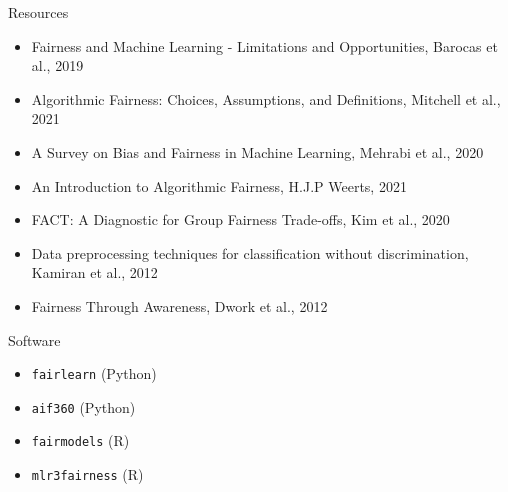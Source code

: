 \documentclass[11pt,compress,t,notes=noshow, xcolor=table]{beamer}
\begin{document}
\begin{vbframe}{Resources}
\begin{itemize}
\item Fairness and Machine Learning - Limitations and Opportunities, Barocas et al., 2019
\item Algorithmic Fairness: Choices, Assumptions, and Definitions, Mitchell et al., 2021
\item A Survey on Bias and Fairness in Machine Learning, Mehrabi et al., 2020
\item An Introduction to Algorithmic Fairness, H.J.P Weerts, 2021
\item FACT: A Diagnostic for Group Fairness Trade-offs, Kim et al., 2020
\item Data preprocessing techniques for classification without discrimination, Kamiran et al., 2012
\item Fairness Through Awareness, Dwork et al., 2012
\end{itemize}
\end{vbframe}

\begin{vbframe}{Software}
  \begin{itemize}
  \item \texttt{fairlearn} (Python)
  \item \texttt{aif360} (Python)
  \item \texttt{fairmodels} (R)
  \item \texttt{mlr3fairness} (R)
  \end{itemize}
  \end{vbframe}

\endlecture
\end{document}

